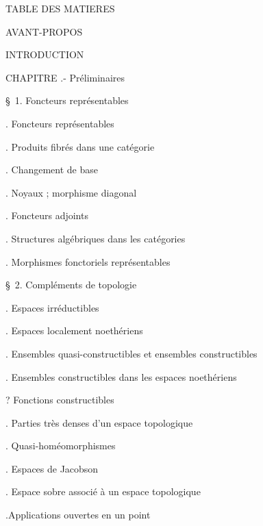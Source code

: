
\begin{center}
TABLE DES MATIERES
\end{center}

\noindent AVANT-PROPOS \dotfill

\noindent INTRODUCTION\dotfill

\noindent CHAPITRE  .- Préliminaires\dotfill

\noindent\quad \S\ 1. Foncteurs représentables\dotfill

\noindent{}. Foncteurs représentables\dotfill

\noindent{}. Produits fibrés dans une catégorie\dotfill

\noindent{}. Changement de base\dotfill

\noindent{}. Noyaux ; morphisme diagonal\dotfill

\noindent{}. Foncteurs adjoints\dotfill

\noindent{}. Structures algébriques dans les catégories\dotfill

\noindent{}. Morphismes fonctoriels représentables\dotfill

\noindent\quad \S\ 2. Compléments de topologie\dotfill

\noindent{}. Espaces irréductibles\dotfill

\noindent{}. Espaces localement noethériens\dotfill

\noindent{}. Ensembles quasi-constructibles et ensembles constructibles\dotfill

\noindent\qquad {}

\noindent\qquad {}

\noindent{}. Ensembles constructibles dans les espaces noethériens

\noindent{}? Fonctions constructibles\dotfill

\noindent{}. Parties très denses d'un espace topologique\dotfill

\noindent{}. Quasi-homéomorphismes\dotfill

\noindent{}. Espaces de Jacobson\dotfill

\noindent{}. Espace sobre associé à un espace topologique\dotfill

\noindent{}.Applications ouvertes en un point \dotfill

